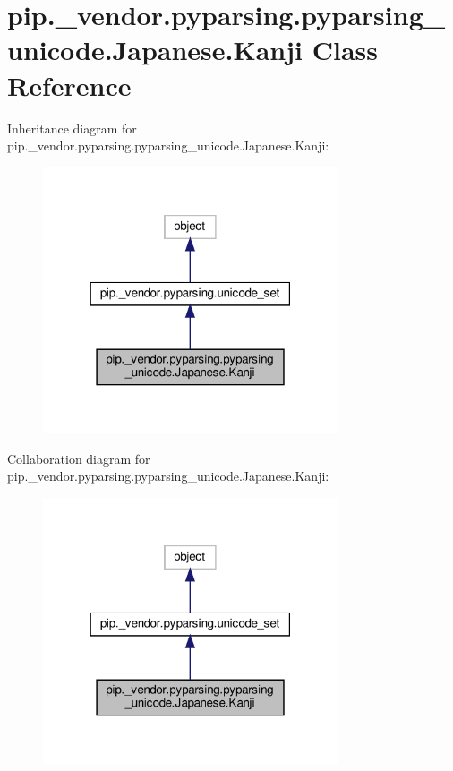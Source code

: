\hypertarget{classpip_1_1__vendor_1_1pyparsing_1_1pyparsing__unicode_1_1Japanese_1_1Kanji}{}\section{pip.\+\_\+vendor.\+pyparsing.\+pyparsing\+\_\+unicode.\+Japanese.\+Kanji Class Reference}
\label{classpip_1_1__vendor_1_1pyparsing_1_1pyparsing__unicode_1_1Japanese_1_1Kanji}


Inheritance diagram for pip.\+\_\+vendor.\+pyparsing.\+pyparsing\+\_\+unicode.\+Japanese.\+Kanji\+:
\nopagebreak
\begin{figure}[H]
\begin{center}
\leavevmode
\includegraphics[width=247pt]{classpip_1_1__vendor_1_1pyparsing_1_1pyparsing__unicode_1_1Japanese_1_1Kanji__inherit__graph}
\end{center}
\end{figure}


Collaboration diagram for pip.\+\_\+vendor.\+pyparsing.\+pyparsing\+\_\+unicode.\+Japanese.\+Kanji\+:
\nopagebreak
\begin{figure}[H]
\begin{center}
\leavevmode
\includegraphics[width=247pt]{classpip_1_1__vendor_1_1pyparsing_1_1pyparsing__unicode_1_1Japanese_1_1Kanji__coll__graph}
\end{center}
\end{figure}
